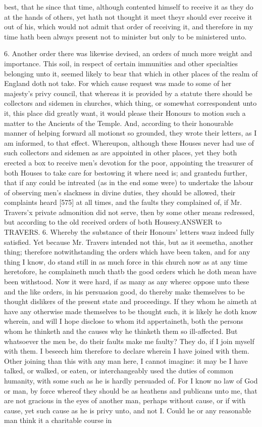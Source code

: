 best, that he since that time, although contented himself to receive it as they do at the hands of others, yet hath not thought it meet theyr should ever receive it out of his, which would not admit that order of receiving it, and therefore in my time hath been always present not to minister but only to be ministered unto.

6. Another order there was likewise devised, an orders of much more weight and importance. This soil, in respect of certain immunities and other specialties belonging unto it, seemed likely to bear that which in other places of the realm of England doth not take. For which cause request was made to some of her majesty’s privy council, that whereas it is provided by a statute there should be collectors and sidemen in churches, which thing, or somewhat correspondent unto it, this place did greatly want, it would please their Honours to motion such a matter to the Ancients of the Temple. And, according to their honourable manner of helping forward all motionst so grounded, they wrote their letters, as I am informed, to that effect. Whereupon, although these Houses never had use of such collectors and sidemen as are appointed in other places, yet they both erected a box to receive men’s devotion for the poor, appointing the treasurer of both Houses to take care for bestowing it where need is; and grantedu further, that if any could be intreated (as in the end some were) to undertake the labour of observing men’s slackness in divine duties, they should be allowed, their complaints heard [575] at all times, and the faults they complained of, if Mr. Travers’x private admonition did not serve, then by some other means redressed, but according to the old received orders of both Housesy.ANSWER to TRAVERS. 6. Whereby the substance of their Honours’ letters wasz indeed fully satisfied. Yet because Mr. Travers intended not this, but as it seemetha, another thing; therefore notwithstanding the orders which have been taken, and for any thing I know, do stand still in as much force in this church now as at any time heretofore, he complaineth much thatb the good orders which he doth mean have been withstood. Now it were hard, if as many as any wherec oppose unto these and the like orders, in his persuasion good, do thereby make themselves to be thought dislikers of the present state and proceedings. If they whom he aimeth at have any otherwise made themselves to be thought such, it is likely he doth know wherein, and will I hope disclose to whom itd appertaineth, both the persons whom he thinketh and the causes why he thinketh them so ill-affected. But whatsoever the men be, do their faults make me faulty? They do, if I join myself with them. I beseech him therefore to declare wherein I have joined with them. Other joining than this with any man here, I cannot imagine: it may be I have talked, or walked, or eaten, or interchangeably used the duties of common humanity, with some such as he is hardly persuaded of. For I know no law of God or man, by force whereof they should be as heathens and publicans unto me, that are not gracious in the eyes of another man, perhaps without cause, or if with cause, yet such cause as he is privy unto, and not I. Could he or any reasonable man think it a charitable course in 
